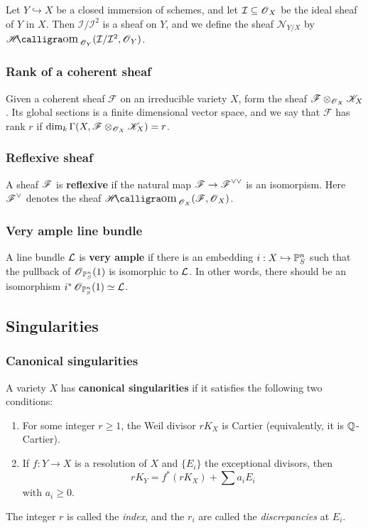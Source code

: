 \documentclass[11pt, english]{article}
\begin{document}
Let $Y \hookrightarrow X$ be a closed immersion of schemes, and let $\mathcal I \subseteq \operatorname{\mathscr{O}}_X$ be the ideal sheaf of $Y$ in $X$. Then $\mathcal I/\mathcal I^2$ is a sheaf on $Y$, and we define the sheaf $\mathcal N_{Y/X}$ by $\Shom_{\OO_Y}(\mathcal I/\mathcal I^2, \mathcal \OO_Y)$.

\subsubsection{Rank of a coherent sheaf}
\label{ranksheaf}

Given a coherent sheaf $\mathscr F$ on an irreducible variety $X$, form the sheaf ${\mathscr F \otimes_{\operatorname{\mathscr{O}}_X} \mathscr K_X}$. Its global sections is a finite dimensional vector space, and we say that $\mathscr F$ has rank $r$ if $\dim_k \Gamma(X,\mathscr F \otimes_{\operatorname{\mathscr{O}}_X} \mathscr K_X) = r$.

\subsubsection{Reflexive sheaf}
\label{reflexivesheaf}

A sheaf $\operatorname{\mathscr{F}}$ is \textbf{reflexive} if the natural map $\operatorname{\mathscr{F}} \to \operatorname{\mathscr{F}}^{\vee\vee}$ is an isomorpism. Here $\operatorname{\mathscr{F}}^\vee$ denotes the sheaf $\Shom_{\OO_X}(\FF,\OO_X)$.

\subsubsection{Very ample line bundle}
\label{veryample}
A line bundle $\mathcal{L}$ is \textbf{very ample} if there is an embedding $i:X \hookrightarrow \mathbb{P}_S^n$ such that the pullback of $\operatorname{\mathscr{O}}_{\mathbb{P}_S^n}(1)$ is isomorphic to $\mathcal{L}$. In other words, there should be an isomorphism $i^\ast \operatorname{\mathscr{O}}_{\mathbb{P}^n_S}(1) \simeq \mathcal{L}$.

\subsection{Singularities}
\subsubsection{Canonical singularities}
\label{canonicalsings}
A variety $X$ has \textbf{canonical singularities} if it satisfies the following two conditions:
\begin{enumerate}
\item For some integer $r \geq 1$, the Weil divisor $r K_X$ is Cartier (equivalently, it is $\mathbb{Q}$-Cartier).
\item If $f:Y \to X$ is a resolution of $X$ and $\{E_i \}$ the exceptional divisors, then
\[
r K_Y = f^\ast(rK_X) + \sum a_i E_i
\]
with $a_i \geq 0$.
\end{enumerate}
The integer $r$ is called the \emph{index}, and the $r_i$ are called the \emph{discrepancies} at $E_i$.
\end{document}
